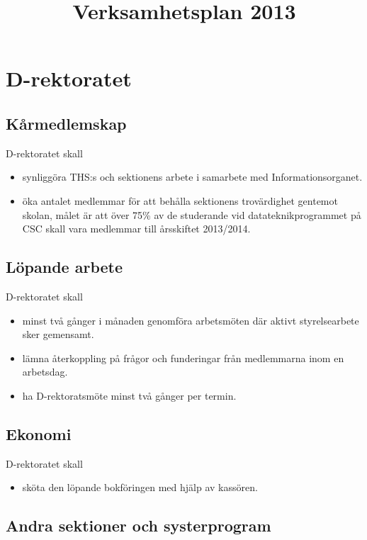 \documentclass{dgovdoc}
\title{Verksamhetsplan 2013}
\begin{document}
\maketitle

\section{D-rektoratet}

\subsection{Kårmedlemskap}

D-rektoratet skall

\begin{itemize}
\item synliggöra THS:s och sektionens arbete i samarbete med Informationsorganet.
\item öka antalet medlemmar för att behålla sektionens trovärdighet gentemot
  skolan, målet är att över 75\% av de studerande vid datateknikprogrammet på CSC
  skall vara medlemmar till årsskiftet 2013/2014.
\end{itemize}

\subsection{Löpande arbete}

D-rektoratet skall

\begin{itemize} 
\item minst två gånger i månaden genomföra arbetsmöten där aktivt
  styrelsearbete sker gemensamt.
\item lämna återkoppling på frågor och funderingar från medlemmarna inom en
  arbetsdag.
\item ha D-rektoratsmöte minst två gånger per termin.
\end{itemize}

\subsection{Ekonomi}

D-rektoratet skall

\begin{itemize}
\item sköta den löpande bokföringen med hjälp av kassören.
\end{itemize}

\subsection{Andra sektioner och systerprogram}
\end{document}
